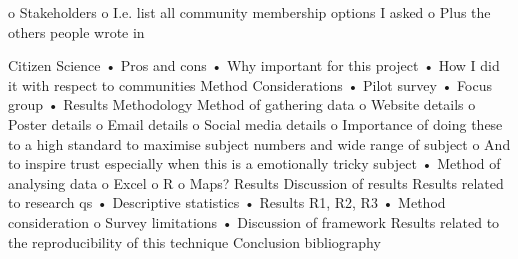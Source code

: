 o	Stakeholders
o	I.e. list all community membership options I asked
o	Plus the others people wrote in

Citizen Science
•	Pros and cons
•	Why important for this project
•	How I did it with respect to communities
Method Considerations
•	Pilot survey
•	Focus group
•	Results
Methodology
Method of gathering data
o	Website details
o	Poster details
o	Email details
o	Social media details
o	Importance of doing these to a high standard to maximise subject numbers and wide range of subject
o	And to inspire trust especially when this is a emotionally tricky subject
•	Method of analysing data
o	Excel
o	R
o	Maps?
Results
Discussion of results
Results related to research qs
•	Descriptive statistics
•	Results R1, R2, R3 
•	Method consideration
o	Survey limitations
•	
Discussion of framework 
Results related to the reproducibility of this technique
Conclusion 
bibliography

